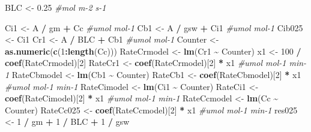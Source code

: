 \documentclass[
]{krantz}
\makeatletter
\newenvironment{Shaded}{\begin{snugshade}}{\end{snugshade}}
\newcommand{\CommentTok}[1]{\textcolor[rgb]{0.56,0.35,0.01}{\textit{#1}}}
\newcommand{\DecValTok}[1]{\textcolor[rgb]{0.00,0.00,0.81}{#1}}
\newcommand{\FloatTok}[1]{\textcolor[rgb]{0.00,0.00,0.81}{#1}}
\newcommand{\KeywordTok}[1]{\textcolor[rgb]{0.13,0.29,0.53}{\textbf{#1}}}
\newcommand{\NormalTok}[1]{#1}
\newcommand{\OperatorTok}[1]{\textcolor[rgb]{0.81,0.36,0.00}{\textbf{#1}}}
\newcommand{\StringTok}[1]{\textcolor[rgb]{0.31,0.60,0.02}{#1}}
\newenvironment{kframe}{%
\medskip{}
\setlength{\fboxsep}{.8em}
 \def\at@end@of@kframe{}%
 \ifinner\ifhmode%
  \def\at@end@of@kframe{\end{minipage}}%
  \begin{minipage}{\columnwidth}%
 \fi\fi%
 \def\FrameCommand##1{\hskip\@totalleftmargin \hskip-\fboxsep
 \colorbox{shadecolor}{##1}\hskip-\fboxsep
     \hskip-\linewidth \hskip-\@totalleftmargin \hskip\columnwidth}%
 \MakeFramed {\advance\hsize-\width
   \@totalleftmargin\z@ \linewidth\hsize
   \@setminipage}}%
 {\par\unskip\endMakeFramed%
 \at@end@of@kframe}
\renewenvironment{Shaded}{\begin{kframe}}{\end{kframe}}
\makeatother
\begin{document}
\begin{Shaded}
\begin{Highlighting}[]
\NormalTok{BLC \textless{}{-}}\StringTok{ }\FloatTok{0.25} \CommentTok{\#mol m{-}2 s{-}1}

\NormalTok{Ci1 \textless{}{-}}\StringTok{ }\NormalTok{A }\OperatorTok{/}\StringTok{ }\NormalTok{gm }\OperatorTok{+}\StringTok{ }\NormalTok{Cc }\CommentTok{\#umol mol{-}1}
\NormalTok{Cb1 \textless{}{-}}\StringTok{ }\NormalTok{A }\OperatorTok{/}\StringTok{ }\NormalTok{gsw }\OperatorTok{+}\StringTok{ }\NormalTok{Ci1 }\CommentTok{\#umol mol{-}1}
\NormalTok{Cib025 \textless{}{-}}\StringTok{ }\NormalTok{Ci1}
\NormalTok{Cr1 \textless{}{-}}\StringTok{ }\NormalTok{A }\OperatorTok{/}\StringTok{ }\NormalTok{BLC }\OperatorTok{+}\StringTok{ }\NormalTok{Cb1 }\CommentTok{\#umol mol{-}1}
\NormalTok{Counter \textless{}{-}}\StringTok{ }\KeywordTok{as.numeric}\NormalTok{(}\KeywordTok{c}\NormalTok{(}\DecValTok{1}\OperatorTok{:}\KeywordTok{length}\NormalTok{(Cc)))}
\NormalTok{RateCrmodel \textless{}{-}}\StringTok{ }\KeywordTok{lm}\NormalTok{(Cr1 }\OperatorTok{\textasciitilde{}}\StringTok{ }\NormalTok{Counter)}
\NormalTok{x1 \textless{}{-}}\StringTok{ }\DecValTok{100} \OperatorTok{/}\StringTok{ }\KeywordTok{coef}\NormalTok{(RateCrmodel)[}\DecValTok{2}\NormalTok{]}
\NormalTok{RateCr1 \textless{}{-}}\StringTok{ }\KeywordTok{coef}\NormalTok{(RateCrmodel)[}\DecValTok{2}\NormalTok{] }\OperatorTok{*}\StringTok{ }\NormalTok{x1 }\CommentTok{\#umol mol{-}1 min{-}1}
\NormalTok{RateCbmodel \textless{}{-}}\StringTok{ }\KeywordTok{lm}\NormalTok{(Cb1 }\OperatorTok{\textasciitilde{}}\StringTok{ }\NormalTok{Counter)}
\NormalTok{RateCb1 \textless{}{-}}\StringTok{ }\KeywordTok{coef}\NormalTok{(RateCbmodel)[}\DecValTok{2}\NormalTok{] }\OperatorTok{*}\StringTok{ }\NormalTok{x1 }\CommentTok{\#umol mol{-}1 min{-}1}
\NormalTok{RateCimodel \textless{}{-}}\StringTok{ }\KeywordTok{lm}\NormalTok{(Ci1 }\OperatorTok{\textasciitilde{}}\StringTok{ }\NormalTok{Counter)}
\NormalTok{RateCi1 \textless{}{-}}\StringTok{ }\KeywordTok{coef}\NormalTok{(RateCimodel)[}\DecValTok{2}\NormalTok{] }\OperatorTok{*}\StringTok{ }\NormalTok{x1 }\CommentTok{\#umol mol{-}1 min{-}1}
\NormalTok{RateCcmodel \textless{}{-}}\StringTok{ }\KeywordTok{lm}\NormalTok{(Cc }\OperatorTok{\textasciitilde{}}\StringTok{ }\NormalTok{Counter)}
\NormalTok{RateCc025 \textless{}{-}}\StringTok{ }\KeywordTok{coef}\NormalTok{(RateCcmodel)[}\DecValTok{2}\NormalTok{] }\OperatorTok{*}\StringTok{ }\NormalTok{x1 }\CommentTok{\#umol mol{-}1 min{-}1}
\NormalTok{res025 \textless{}{-}}\StringTok{ }\DecValTok{1} \OperatorTok{/}\StringTok{ }\NormalTok{gm }\OperatorTok{+}\StringTok{ }\DecValTok{1} \OperatorTok{/}\StringTok{ }\NormalTok{BLC }\OperatorTok{+}\StringTok{ }\DecValTok{1} \OperatorTok{/}\StringTok{ }\NormalTok{gsw}


\end{Highlighting}
\end{Shaded}
\end{document}
